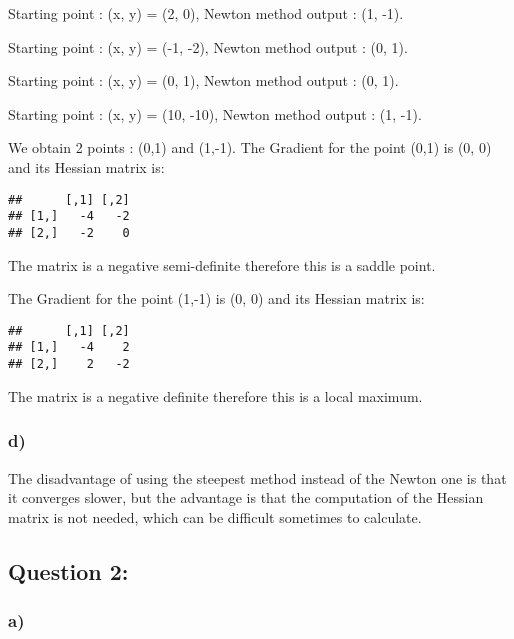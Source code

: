 \documentclass[
]{article}
\begin{document}
Starting point : (x, y) = (2, 0), Newton method output : (1, -1).

Starting point : (x, y) = (-1, -2), Newton method output : (0, 1).

Starting point : (x, y) = (0, 1), Newton method output : (0, 1).

Starting point : (x, y) = (10, -10), Newton method output : (1, -1).

We obtain 2 points : (0,1) and (1,-1). The Gradient for the point (0,1)
is (0, 0) and its Hessian matrix is:

\begin{verbatim}
##      [,1] [,2]
## [1,]   -4   -2
## [2,]   -2    0
\end{verbatim}

The matrix is a negative semi-definite therefore this is a saddle point.

The Gradient for the point (1,-1) is (0, 0) and its Hessian matrix is:

\begin{verbatim}
##      [,1] [,2]
## [1,]   -4    2
## [2,]    2   -2
\end{verbatim}

The matrix is a negative definite therefore this is a local maximum.

\hypertarget{d}{%
\subsubsection{d)}\label{d}}

The disadvantage of using the steepest method instead of the Newton one
is that it converges slower, but the advantage is that the computation
of the Hessian matrix is not needed, which can be difficult sometimes to
calculate.

\hypertarget{question-2}{%
\subsection{Question 2:}\label{question-2}}

\hypertarget{a-1}{%
\subsubsection{a)}\label{a-1}}
\end{document}
